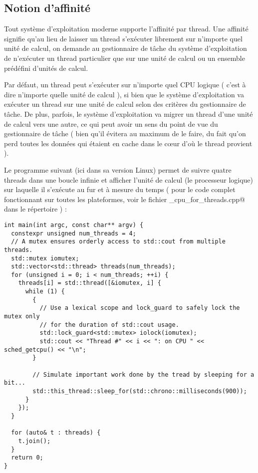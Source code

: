 \documentclass[fleqn,11pt]{article}
\begin{document}
\subsection{Notion d'affinité}

Tout système d'exploitation moderne supporte l'affinité par thread. Une affinité signifie qu'au lieu de laisser un thread s'exécuter librement sur n'importe quel unité de calcul, on demande au gestionnaire de tâche du système d'exploitation de n'exécuter un thread particulier que sur une unité de calcul ou un ensemble prédéfini d'unités de calcul.

Par défaut, un thread peut s'exécuter sur n'importe quel CPU logique ( c'est à dire n'importe quelle unité de calcul ), si bien que le système d'exploitation va exécuter un thread sur une unité de calcul selon des critères du gestionnaire de tâche. De plus, parfois, le système d'exploitation va migrer un thread d'une unité de calcul vers une autre, ce qui peut avoir un sens du point de vue du gestionnaire de tâche ( bien qu'il évitera au maximum de le faire, du fait qu'on perd toutes les données qui étaient en cache dans le c{\oe}ur d'où le thread provient ).

Le programme suivant (ici dans sa version Linux) permet de suivre quatre threads
dans une boucle infinie et afficher l'unité de calcul (le processeur logique) sur laquelle il s'exécute au fur et à mesure du temps ( pour le code complet fonctionnant sur toutes les plateformes, voir le fichier \verb@get_cpu_for_threads.cpp@ dans le répertoire \verb@Example@) :
\begin{lstlisting}
int main(int argc, const char** argv) {
  constexpr unsigned num_threads = 4;
  // A mutex ensures orderly access to std::cout from multiple threads.
  std::mutex iomutex;
  std::vector<std::thread> threads(num_threads);
  for (unsigned i = 0; i < num_threads; ++i) {
    threads[i] = std::thread([&iomutex, i] {
      while (1) {
        {
          // Use a lexical scope and lock_guard to safely lock the mutex only
          // for the duration of std::cout usage.
          std::lock_guard<std::mutex> iolock(iomutex);
          std::cout << "Thread #" << i << ": on CPU " << sched_getcpu() << "\n";
        }

        // Simulate important work done by the tread by sleeping for a bit...
        std::this_thread::sleep_for(std::chrono::milliseconds(900));
      }
    });
  }

  for (auto& t : threads) {
    t.join();
  }
  return 0;
}
\end{lstlisting}
\end{document}
